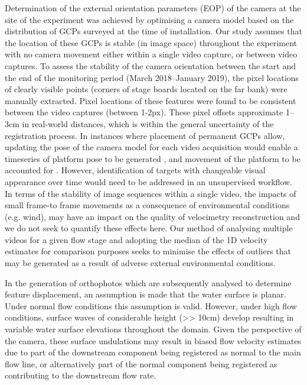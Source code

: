 \documentclass[hess, manuscript]{copernicus} %
\begin{document}
Determination of the external orientation parameters (EOP) of the camera at the site of the experiment was achieved by optimising a camera model based on the distribution of GCPs surveyed at the time of installation. Our study assumes that the location of these GCPs is stable (in image space) throughout the experiment with no camera movement either within a single video capture, or between video captures. To assess the stability of the camera orientation between the start and the end of the monitoring period (March 2018--January 2019), the pixel locations of clearly visible points (corners of stage boards located on the far bank) were manually extracted. Pixel locations of these features were found to be consistent between the video captures (between 1-2px). These pixel offsets approximate 1–3cm in real-world distances, which is within the general uncertainty of the registration process. In instances where placement of permanent GCPs allow, updating the pose of the camera model for each video acquisition would enable a timeseries of platform pose to be generated \citep[e.g.][]{perks2024}, and movement of the platform to be accounted for \citep[e.g.][]{eltner2021}. However, identification of targets with changeable visual appearance over time would need to be addressed in an unsupervised workflow. In terms of the stability of image sequences within a single video, the impacts of small frame-to frame movements as a consequence of environmental conditions (e.g. wind), may have an impact on the quality of velocimetry reconstruction and we do not seek to quantify these effects here. Our method of analysing multiple videos for a given flow stage and adopting the median of the 1D velocity estimates for comparison purposes seeks to minimise the effects of outliers that may be generated as a result of adverse external environmental conditions.

In the generation of orthophotos which are subsequently analysed to determine feature displacement, an assumption is made that the water surface is planar. Under normal flow conditions this assumption is valid. However, under high flow conditions, surface waves of considerable height (>> 10cm) develop resulting in variable water surface elevations throughout the domain. Given the perspective of the camera, these surface undulations may result in biased flow velocity estimates due to part of the downstream component being registered as normal to the main flow line, or alternatively part of the normal component being registered as contributing to the downstream flow rate.
\end{document}
